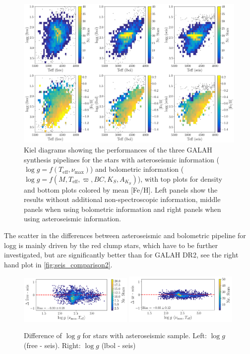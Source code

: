 \documentclass[a4paper,11pt,english]{article}
\begin{document}
\begin{figure}[!ht]
\centering
\includegraphics[width=\textwidth]{../../seis/figures/seis_comparison_3setups.png}
\caption{Kiel diagrams showing the performances of the three GALAH synthesis pipelines for the stars with asteroseismic information ($\log g = f(T_\text{eff}, \nu_\text{max})$) and bolometric information ($\log g = f(M, T_\text{eff}, \varpi, BC, K_S, A_{K_S})$), with top plots for density and bottom plots colored by mean [Fe/H]. Left panels show the results without additional non-spectroscopic information, middle panels when using bolometric information and right panels when using asteroseismic information.}
\label{fig:seis_comparison1}
\end{figure}

The scatter in the differences between asteroseismic and bolometric pipeline for logg is mainly driven by the red clump stars, which have to be further investigated, but are significantly better than for GALAH DR2, see the right hand plot in \autoref{fig:seis_comparison2}.

\begin{figure}[!ht]
\centering
\includegraphics[width=0.49\textwidth]{../../seis/figures/seismic_sample_delta_free.png}
\includegraphics[width=0.49\textwidth]{../../seis/figures/seismic_sample_delta_lbol.png}
\caption{Difference of $\log g$ for stars with asteroseismic sample. Left: $\log g$ (free - seis). Right: $\log g$ (lbol - seis)}
\label{fig:seis_comparison2}
\end{figure}
\end{document}

